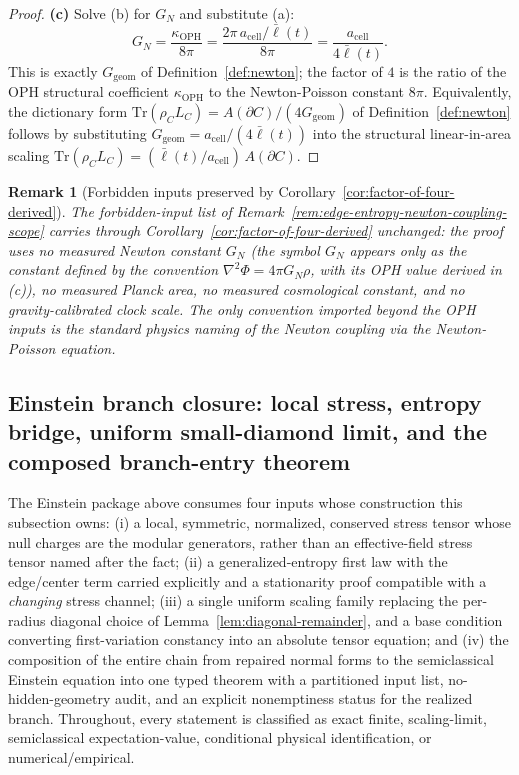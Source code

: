 \documentclass[11pt]{article}
\newtheorem{remark}[theorem]{Remark}
\begin{document}
\begin{proof}
\textbf{(c)} Solve (b) for \(G_N\) and substitute (a):
\[
G_N=\frac{\kappa_{\mathrm{OPH}}}{8\pi}=\frac{2\pi\,a_{\mathrm{cell}}/\bar\ell(t)}{8\pi}=\frac{a_{\mathrm{cell}}}{4\bar\ell(t)}.
\]
This is exactly \(G_{\mathrm{geom}}\) of Definition~\ref{def:newton}; the factor of \(4\) is the ratio of the OPH structural coefficient \(\kappa_{\mathrm{OPH}}\) to the Newton-Poisson constant \(8\pi\). Equivalently, the dictionary form \(\mathrm{Tr}(\rho_C L_C)=A(\partial C)/(4G_{\mathrm{geom}})\) of Definition~\ref{def:newton} follows by substituting \(G_{\mathrm{geom}}=a_{\mathrm{cell}}/(4\bar\ell(t))\) into the structural linear-in-area scaling \(\mathrm{Tr}(\rho_C L_C)=(\bar\ell(t)/a_{\mathrm{cell}})\,A(\partial C)\).
\end{proof}

\begin{remark}[Forbidden inputs preserved by Corollary~\ref{cor:factor-of-four-derived}]\label{rem:factor-of-four-forbidden-inputs}
The forbidden-input list of Remark~\ref{rem:edge-entropy-newton-coupling-scope} carries through Corollary~\ref{cor:factor-of-four-derived} unchanged: the proof uses no measured Newton constant \(G_N\) (the symbol \(G_N\) appears only as the constant defined by the convention \(\nabla^2\Phi=4\pi G_N\rho\), with its OPH value derived in (c)), no measured Planck area, no measured cosmological constant, and no gravity-calibrated clock scale. The only convention imported beyond the OPH inputs is the standard physics naming of the Newton coupling via the Newton-Poisson equation.
\end{remark}

\subsection{Einstein branch closure: local stress, entropy bridge, uniform small-diamond limit, and the composed branch-entry theorem}
\label{subsec:einstein-branch-closure}

The Einstein package above consumes four inputs whose construction this
subsection owns: (i) a local, symmetric, normalized, conserved stress tensor
whose null charges are the modular generators, rather than an effective-field
stress tensor named after the fact; (ii) a generalized-entropy first law with
the edge/center term carried explicitly and a stationarity proof compatible
with a \emph{changing} stress channel; (iii) a single uniform scaling family
replacing the per-radius diagonal choice of Lemma~\ref{lem:diagonal-remainder},
and a base condition converting first-variation constancy into an absolute
tensor equation; and (iv) the composition of the entire chain from repaired
normal forms to the semiclassical Einstein equation into one typed theorem
with a partitioned input list, no-hidden-geometry audit, and an explicit
nonemptiness status for the realized branch. Throughout, every statement is
classified as exact finite, scaling-limit, semiclassical expectation-value,
conditional physical identification, or numerical/empirical.
\end{document}

